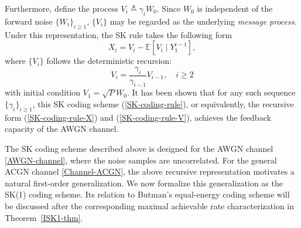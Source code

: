 \documentclass[12pt]{article}
\newcommand{\E}{\mathbb{E}}
\begin{document}
Furthermore, define the process $V_i \triangleq \gamma_i W_0$. Since $W_0$ is independent of the forward noise $\{W_i\}_{i\ge 1}$, $\{V_i\}$ may be regarded as the underlying {\it message process}. Under this representation, the SK rule takes the following form
\begin{equation}\label{SK-coding-rule-X}
X_i = V_i - \E[V_i\mid Y_1^{i-1}],
\end{equation}
where $\{V_i\}$ follows the deterministic recursion:
\begin{equation}\label{SK-coding-rule-V}
V_i = \frac{\gamma_i}{\gamma_{i-1}} V_{i-1},\quad i\ge 2
\end{equation}
with initial condition $V_1=\sqrt{P}W_0$. It has been shown \cite{schalkwijk1966coding2,schalkwijk1966coding,el2011network,durrett2019probability} that for any such sequence $\{\gamma_i\}_{i\ge1}$, this SK coding scheme (\ref{SK-coding-rule}), or equivalently, the recursive form (\ref{SK-coding-rule-X}) and (\ref{SK-coding-rule-V}), achieves the feedback capacity of the AWGN channel.


The SK coding scheme described above is designed for the AWGN channel \eqref{AWGN-channel}, where the noise samples are uncorrelated. For the general ACGN channel \eqref{Channel-ACGN}, the above recursive representation motivates a natural first-order generalization. We now formalize this generalization as the SK(1) coding scheme. Its relation to Butman's equal-energy coding scheme will be discussed after the corresponding maximal achievable rate characterization in Theorem~\ref{ISK1-thm}.
\end{document}
